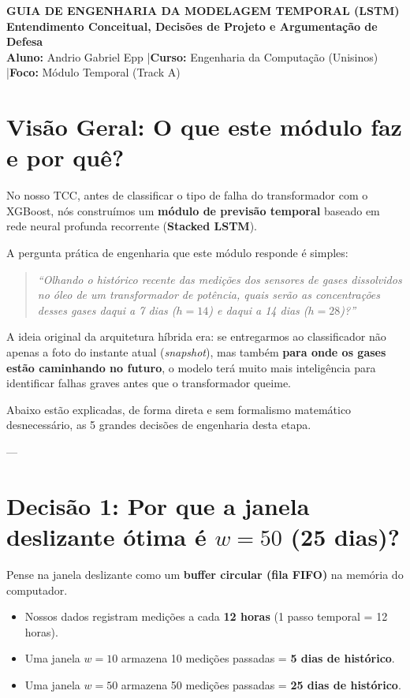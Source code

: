 \documentclass[10pt,a4paper]{article}
\begin{document}
\begin{center}
  {\Large\textbf{\textsf{\color{NavyBlue}GUIA DE ENGENHARIA DA MODELAGEM TEMPORAL (LSTM)}}}\\[3pt]
  {\large\textbf{\textsf{Entendimento Conceitual, Decisões de Projeto e Argumentação de Defesa}}}\\[4pt]
  \textbf{Aluno:} Andrio Gabriel Epp \quad|\quad \textbf{Curso:} Engenharia da Computação (Unisinos) \quad|\quad \textbf{Foco:} Módulo Temporal (Track A)
\end{center}

\vspace{-4pt}
\noindent\makebox[\linewidth]{\rule{\textwidth}{1.0pt}}

\section{Visão Geral: O que este módulo faz e por quê?}

No nosso TCC, antes de classificar o tipo de falha do transformador com o XGBoost, nós construímos um \textbf{módulo de previsão temporal} baseado em rede neural profunda recorrente (\textbf{Stacked LSTM}).

A pergunta prática de engenharia que este módulo responde é simples:
\begin{quote}
\textit{``Olhando o histórico recente das medições dos sensores de gases dissolvidos no óleo de um transformador de potência, quais serão as concentrações desses gases daqui a 7 dias ($h=14$) e daqui a 14 dias ($h=28$)?''}
\end{quote}

A ideia original da arquitetura híbrida era: se entregarmos ao classificador não apenas a foto do instante atual (\textit{snapshot}), mas também \textbf{para onde os gases estão caminhando no futuro}, o modelo terá muito mais inteligência para identificar falhas graves antes que o transformador queime.

Abaixo estão explicadas, de forma direta e sem formalismo matemático desnecessário, as 5 grandes decisões de engenharia desta etapa.

---

\section{Decisão 1: Por que a janela deslizante ótima é $w = 50$ (25 dias)?}

\begin{conceitobox}
Pense na janela deslizante como um \textbf{buffer circular (fila FIFO)} na memória do computador. 
\begin{itemize}[leftmargin=*,itemsep=1pt]
  \item Nossos dados registram medições a cada \textbf{12 horas} (1 passo temporal = 12 horas).
  \item Uma janela $w = 10$ armazena 10 medições passadas = \textbf{5 dias de histórico}.
  \item Uma janela $w = 50$ armazena 50 medições passadas = \textbf{25 dias de histórico}.
\end{itemize}
\end{conceitobox}
\end{document}
